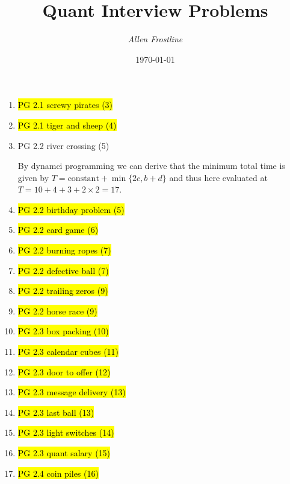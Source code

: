 \documentclass[11pt]{article}
\title{\vspace*{-2em}\sc Quant Interview Problems}
\author{\textit{\small Allen Frostline}}
\date{\vspace{-3em}\small{\today}}
\newenvironment{note}{\begin{enumerate}[leftmargin=1em,topsep=0pt,noitemsep]}{\end{enumerate}}
\newcommand{\solution}{\boxed{\textbf{SOLUTION}}\hspace{.5em}}
\begin{document}
\begin{spacing}{1.1}

\maketitle
\thispagestyle{empty}

\vspace{-1.5em}
\begin{note}

\item \hl{PG 2.1 screwy pirates (3)}

\item \hl{PG 2.1 tiger and sheep (4)}

\item PG 2.2 river crossing (5)

\solution By dynamci programming we can derive that the minimum total time is given by $T = \text{constant} + \min\{2c, b+d\}$ and thus here evaluated at $T = 10+4+3+2\times 2 = 17$.

\item \hl{PG 2.2 birthday problem (5)}

\item \hl{PG 2.2 card game (6)}

\item \hl{PG 2.2 burning ropes (7)}

\item \hl{PG 2.2 defective ball (7)}

\item \hl{PG 2.2 trailing zeros (9)}

\item \hl{PG 2.2 horse race (9)}

\item \hl{PG 2.3 box packing (10)}

\item \hl{PG 2.3 calendar cubes (11)}

\item \hl{PG 2.3 door to offer (12)}

\item \hl{PG 2.3 message delivery (13)}

\item \hl{PG 2.3 last ball (13)}

\item \hl{PG 2.3 light switches (14)}

\item \hl{PG 2.3 quant salary (15)}

\item \hl{PG 2.4 coin piles (16)}


\end{note}
\end{spacing}
\end{document}
